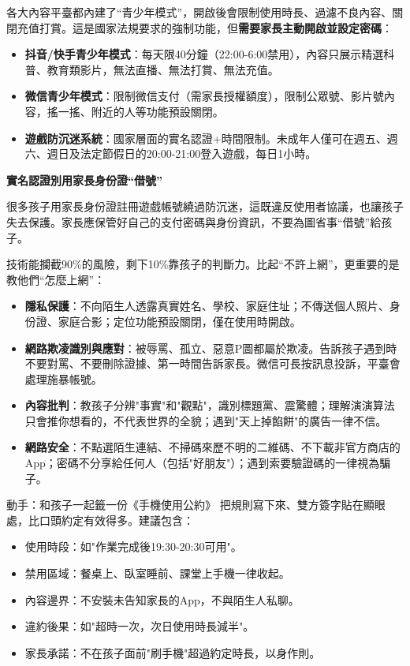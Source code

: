 
各大內容平臺都內建了“青少年模式”，開啟後會限制使用時長、過濾不良內容、關閉充值打賞。這是國家法規要求的強制功能，但\textbf{需要家長主動開啟並設定密碼}：

\begin{itemize}
  \item \textbf{抖音/快手青少年模式}：每天限40分鐘（22:00-6:00禁用），內容只展示精選科普、教育類影片，無法直播、無法打賞、無法充值。
  \item \textbf{微信青少年模式}：限制微信支付（需家長授權額度），限制公眾號、影片號內容，搖一搖、附近的人等功能預設關閉。
  \item \textbf{遊戲防沉迷系統}：國家層面的實名認證+時間限制。未成年人僅可在週五、週六、週日及法定節假日的20:00-21:00登入遊戲，每日1小時。
\end{itemize}

\textbf{實名認證別用家長身份證“借號”}\par

很多孩子用家長身份證註冊遊戲帳號繞過防沉迷，這既違反使用者協議，也讓孩子失去保護。家長應保管好自己的支付密碼與身份資訊，不要為圖省事“借號”給孩子。


技術能攔截90\%的風險，剩下10\%靠孩子的判斷力。比起“不許上網”，更重要的是教他們“怎麼上網”：

\begin{itemize}
  \item \textbf{隱私保護}：不向陌生人透露真實姓名、學校、家庭住址；不傳送個人照片、身份證、家庭合影；定位功能預設關閉，僅在使用時開啟。
  \item \textbf{網路欺凌識別與應對}：被辱罵、孤立、惡意P圖都屬於欺凌。告訴孩子遇到時不要對罵、不要刪除證據、第一時間告訴家長。微信可長按訊息投訴，平臺會處理施暴帳號。
  \item \textbf{內容批判}：教孩子分辨"事實"和"觀點"，識別標題黨、震驚體；理解演演算法只會推你想看的，不代表世界的全貌；遇到"天上掉餡餅"的廣告一律不信。
  \item \textbf{網路安全}：不點選陌生連結、不掃碼來歷不明的二維碼、不下載非官方商店的App；密碼不分享給任何人（包括"好朋友"）；遇到索要驗證碼的一律視為騙子。
\end{itemize}

\begin{tcbpractice}{動手：和孩子一起籤一份《手機使用公約》}
把規則寫下來、雙方簽字貼在顯眼處，比口頭約定有效得多。建議包含：

\begin{itemize}
  \item 使用時段：如"作業完成後19:30-20:30可用"。
  \item 禁用區域：餐桌上、臥室睡前、課堂上手機一律收起。
  \item 內容邊界：不安裝未告知家長的App，不與陌生人私聊。
  \item 違約後果：如"超時一次，次日使用時長減半"。
  \item 家長承諾：不在孩子面前"刷手機"超過約定時長，以身作則。
\end{itemize}

\end{tcbpractice}

